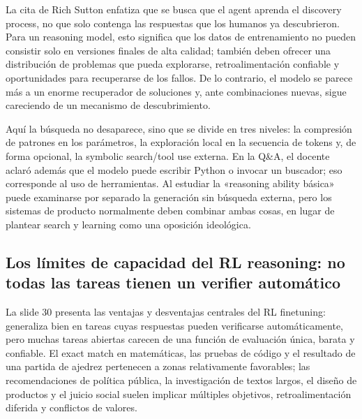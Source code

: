 La cita de Rich Sutton enfatiza que se busca que el agent aprenda el discovery process, no que solo contenga las respuestas que los humanos ya descubrieron. Para un reasoning model, esto significa que los datos de entrenamiento no pueden consistir solo en versiones finales de alta calidad; también deben ofrecer una distribución de problemas que pueda explorarse, retroalimentación confiable y oportunidades para recuperarse de los fallos. De lo contrario, el modelo se parece más a un enorme recuperador de soluciones y, ante combinaciones nuevas, sigue careciendo de un mecanismo de descubrimiento.



Aquí la búsqueda no desaparece, sino que se divide en tres niveles: la compresión de patrones en los parámetros, la exploración local en la secuencia de tokens y, de forma opcional, la symbolic search/tool use externa. En la Q\&A, el docente aclaró además que el modelo puede escribir Python o invocar un buscador; eso corresponde al uso de herramientas. Al estudiar la «reasoning ability básica» puede examinarse por separado la generación sin búsqueda externa, pero los sistemas de producto normalmente deben combinar ambas cosas, en lugar de plantear search y learning como una oposición ideológica.

\subsection{Los límites de capacidad del RL reasoning: no todas las tareas tienen un verifier automático}

La slide 30 presenta las ventajas y desventajas centrales del RL finetuning: generaliza bien en tareas cuyas respuestas pueden verificarse automáticamente, pero muchas tareas abiertas carecen de una función de evaluación única, barata y confiable. El exact match en matemáticas, las pruebas de código y el resultado de una partida de ajedrez pertenecen a zonas relativamente favorables; las recomendaciones de política pública, la investigación de textos largos, el diseño de productos y el juicio social suelen implicar múltiples objetivos, retroalimentación diferida y conflictos de valores.

